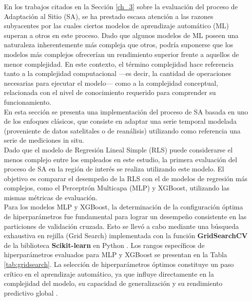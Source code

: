 En los trabajos citados en la Sección \ref{ch_3} sobre la evaluación del proceso de Adaptación al Sitio (SA), se ha prestado escasa atención a las razones subyacentes por las cuales ciertos modelos de aprendizaje automático (ML) superan a otros en este proceso. Dado que algunos modelos de ML poseen una naturaleza inherentemente más compleja que otros, podría suponerse que los modelos más complejos ofrecerían un rendimiento superior frente a aquellos de menor complejidad. En este contexto, el término complejidad hace referencia tanto a la complejidad computacional —es decir, la cantidad de operaciones necesarias para ejecutar el modelo— como a la complejidad conceptual, relacionada con el nivel de conocimiento requerido para comprender su funcionamiento.\\

En esta sección se presenta una implementación del proceso de SA basada en uno de los enfoques clásicos, que consiste en adaptar una serie temporal modelada (proveniente de datos satelitales o de reanálisis) utilizando como referencia una serie de mediciones in situ.\\

Dado que el modelo de Regresión Lineal Simple (RLS) puede considerarse el menos complejo entre los empleados en este estudio, la primera evaluación del proceso de SA en la región de interés se realiza utilizando este modelo. El objetivo es comparar el desempeño de la RLS con el de modelos de regresión más complejos, como el Perceptrón Multicapa (MLP) y XGBoost, utilizando las mismas métricas de evaluación.\\

Para los modelos MLP y XGBoost, la determinación de la configuración óptima de hiperparámetros fue fundamental para lograr un desempeño consistente en las particiones de validación cruzada. Esto se llevó a cabo mediante una búsqueda exhaustiva en rejilla (Grid Search) implementada con la función \textbf{GridSearchCV} de la biblioteca \textbf{Scikit-learn} en Python \cite{Pedregosa2012}. Los rangos específicos de hiperparámetros evaluados para MLP y XGBoost se presentan en la Tabla \ref{tab:gridsearch}. La selección de hiperparámetros óptimos constituye un paso crítico en el aprendizaje automático, ya que influye directamente en la complejidad del modelo, su capacidad de generalización y su rendimiento predictivo global \cite{Goodfellow2016}.\\



